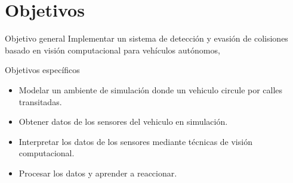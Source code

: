 \documentclass[8pt]{beamer}
\begin{document}
    \section{Objetivos}
    \begin{frame}{Objetivo general}
        Implementar un sistema de detección y evasión de colisiones basado en visión computacional para vehículos autónomos,
    \end{frame}
    \begin{frame}{Objetivos específicos}
        \begin{itemize}
            \item Modelar un ambiente de simulación donde un vehiculo circule por calles transitadas.
            \item Obtener datos de los sensores del vehiculo en simulación.
            \item Interpretar los datos de los sensores mediante técnicas de visión computacional.
            \item Procesar los datos y aprender a reaccionar.
        \end{itemize}
    \end{frame}
\end{document}
